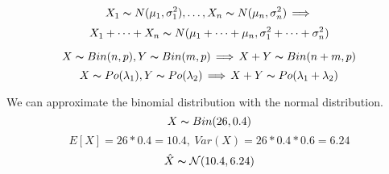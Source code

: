 \documentclass{article}
\newcommand{\N}{{\mathcal{N}}}
\begin{document}


$$
X_1\thicksim N(\mu_1, \sigma_1^2), \dots,  X_n\thicksim N(\mu_n, \sigma_n^2) \operatorname{\implies}
$$
$$
X_1+\dots+X_n \thicksim N(\mu_1+\dots+\mu_n, \sigma_1^2+\dots+\sigma_n^2)
$$


$$
X\thicksim Bin(n, p), Y\thicksim Bin(m, p) \operatorname{\implies} X+Y \thicksim Bin(n+m, p)
$$
$$
X\thicksim Po(\lambda_1), Y\thicksim Po(\lambda_2) \operatorname{\implies} X+Y \thicksim Po(\lambda_1 + \lambda_2)
$$

We can approximate the binomial distribution with the normal distribution.
$$ X\thicksim Bin(26, 0.4) $$
$$ E[X] = 26*0.4 = 10.4,\ Var(X) = 26*0.4*0.6 = 6.24 $$
$$ \hat{X}\thicksim \N(10.4, 6.24) $$
\end{document}
